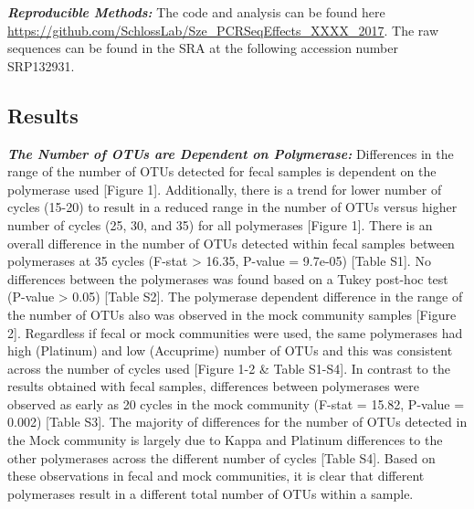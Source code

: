 \documentclass[12pt,]{article}
\begin{document}
\textbf{\emph{Reproducible Methods:}} The code and analysis can be found
here \url{https://github.com/SchlossLab/Sze_PCRSeqEffects_XXXX_2017}.
The raw sequences can be found in the SRA at the following accession
number SRP132931.

\newpage

\subsection{Results}\label{results}

\textbf{\emph{The Number of OTUs are Dependent on Polymerase:}}
Differences in the range of the number of OTUs detected for fecal
samples is dependent on the polymerase used {[}Figure 1{]}.
Additionally, there is a trend for lower number of cycles (15-20) to
result in a reduced range in the number of OTUs versus higher number of
cycles (25, 30, and 35) for all polymerases {[}Figure 1{]}. There is an
overall difference in the number of OTUs detected within fecal samples
between polymerases at 35 cycles (F-stat \textgreater{} 16.35, P-value =
9.7e-05) {[}Table S1{]}. No differences between the polymerases was
found based on a Tukey post-hoc test (P-value \textgreater{} 0.05)
{[}Table S2{]}. The polymerase dependent difference in the range of the
number of OTUs also was observed in the mock community samples {[}Figure
2{]}. Regardless if fecal or mock communities were used, the same
polymerases had high (Platinum) and low (Accuprime) number of OTUs and
this was consistent across the number of cycles used {[}Figure 1-2 \&
Table S1-S4{]}. In contrast to the results obtained with fecal samples,
differences between polymerases were observed as early as 20 cycles in
the mock community (F-stat = 15.82, P-value = 0.002) {[}Table S3{]}. The
majority of differences for the number of OTUs detected in the Mock
community is largely due to Kappa and Platinum differences to the other
polymerases across the different number of cycles {[}Table S4{]}. Based
on these observations in fecal and mock communities, it is clear that
different polymerases result in a different total number of OTUs within
a sample.
\end{document}
